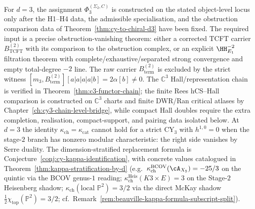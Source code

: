 \begin{remark}[The \texorpdfstring{$d = 3$}{d = 3} case]
\label{rem:cy-cat-d3}
For $d = 3$, the assignment $\Phi_3^{(\Sigma_2,C)}$ is constructed on the stated object-level locus only after the H1--H4 data, the admissible specialisation, and the obstruction comparison data of Theorem~\ref{thm:cy-to-chiral-d3} have been fixed. The required input is a precise obstruction-vanishing theorem: either a corrected TCFT carrier $B^{(2)}_{\mathrm{TCFT}}$ with its comparison to the obstruction complex, or an explicit $\HH^{-2}_{E_1}$ filtration theorem with complete/exhaustive/separated strong convergence and empty total-degree $-2$ line. The raw carrier $B^{(2)}_{\mathrm{term}}$ is excluded by the strict witness $[m_3,B^{(2)}_{\mathrm{term}}][a|a|a|a|b]=2\alpha[b]\neq0$. The $\mathbb{C}^3$ Hall/representation chain is verified in Theorem~\ref{thm:c3-functor-chain}; the finite Rees hCS--Hall comparison is constructed on $\mathbb{C}^3$ charts and finite DWR/Ran critical atlases by Chapter~\ref{ch:cy3-chain-level-bridge}, while compact Hall doubles require the extra completion, realisation, compact-support, and pairing data isolated below. At $d = 3$ the identity $\kappa_{\mathrm{ch}} = \kappa_{\mathrm{cat}}$ cannot hold for a strict CY$_3$ with $h^{1,0} = 0$ when the stage-$2$ branch has nonzero modular characteristic: the right side vanishes by Serre duality. The dimension-stratified replacement formula is Conjecture~\textup{\ref{conj:cy-kappa-identification}}, with concrete values catalogued in Theorem~\textup{\ref{thm:kappa-stratification-by-d}} (e.g.\ $\kappa_{\mathrm{ch}}^{\mathrm{BCOV}}(\cA_{X_5}) = -25/3$ on the quintic via the BCOV genus-$1$ reading; $\kappa_{\mathrm{ch}}^{\mathrm{Heis}}(K3 \times E) = 3$ on the Stage-$2$ Heisenberg shadow; $\kappa_{\mathrm{ch}}(\text{local }\mathbb{P}^2) = 3/2$ via the direct McKay shadow $\tfrac12\chi_{\mathrm{top}}(\mathbb{P}^2) = 3/2$; cf.\ Remark~\ref{rem:beauville-kappa-formula-subscript-split}).
\end{remark}

